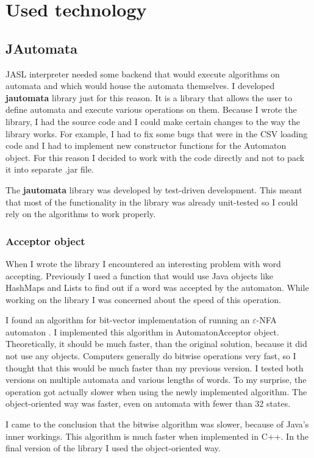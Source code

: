 \documentclass{ctuthesis}
\begin{document}
\section{Used technology}
\subsection{JAutomata}
JASL interpreter needed some backend that would execute algorithms on automata and which would house the automata themselves. I developed \textbf{jautomata} library just for this reason. It is a library that allows the user to define automata and execute various operations on them. Because I wrote the library, I had the source code and I could make certain changes to the way the library works. For example, I had to fix some bugs that were in the CSV loading code and I had to implement new constructor functions for the Automaton object. For this reason I decided to work with the code directly and not to pack it into separate .jar file. 

The \textbf{jautomata} library was developed by test-driven development. This meant that most of the functionality in the library was already unit-tested so I could rely on the algorithms to work properly. 

\subsubsection{Acceptor object}
When I wrote the library I encountered an interesting problem with word accepting. Previously I used a function that would use Java objects like HashMaps and Lists to find out if a word was accepted by the automaton. While working on the library I was concerned about the speed of this operation. 

I found an algorithm for bit-vector implementation of running an $\varepsilon$-NFA automaton \cite{acceptor-algorithm}. I implemented this algorithm in AutomatonAcceptor object. Theoretically, it should be much faster, than the original solution, because it did not use any objects. Computers generally do bitwise operations very fast, so I thought that this would be much faster than my previous version. I tested both versions on multiple automata and various lengths of words. To my surprise, the operation got actually slower when using the newly implemented algorithm. The object-oriented way was faster, even on automata with fewer than 32 states. 

I came to the conclusion that the bitwise algorithm was slower, because of Java's inner workings. This algorithm is much faster when implemented in C++. In the final version of the library I used the object-oriented way.
\end{document}
